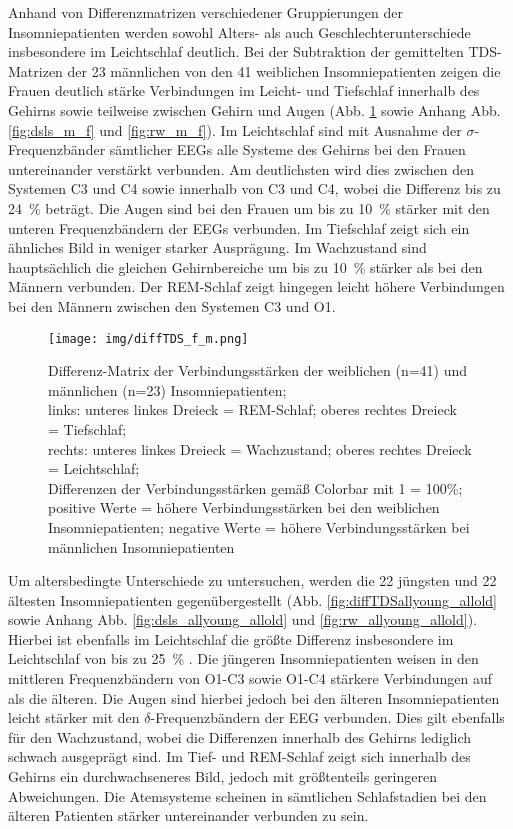 Anhand von Differenzmatrizen verschiedener Gruppierungen der Insomniepatienten werden sowohl Alters- als auch Geschlechterunterschiede insbesondere im Leichtschlaf deutlich. Bei der Subtraktion der gemittelten \acs{TDS}-Matrizen der 23 männlichen von den 41 weiblichen Insomniepatienten zeigen die Frauen deutlich stärke Verbindungen im Leicht- und Tiefschlaf innerhalb des Gehirns sowie teilweise zwischen Gehirn und Augen (Abb. \ref{fig:diffTDS_f_m} sowie Anhang Abb. \ref{fig:dsls_m_f} und \ref{fig:rw_m_f}). Im Leichtschlaf sind mit Ausnahme der $\sigma$-Frequenzbänder sämtlicher \acs{EEG}s alle Systeme des Gehirns bei den Frauen untereinander verstärkt verbunden. Am deutlichsten wird dies zwischen den Systemen C3 und C4 sowie innerhalb von C3 und C4, wobei die Differenz bis zu 24~\% beträgt. Die Augen sind bei den Frauen um bis zu 10~\% stärker mit den unteren Frequenzbändern der \acs{EEG}s verbunden. Im Tiefschlaf zeigt sich ein ähnliches Bild in weniger starker Ausprägung. Im Wachzustand sind hauptsächlich die gleichen Gehirnbereiche um bis zu 10~\% stärker als bei den Männern verbunden. Der \acs{REM}-Schlaf zeigt hingegen leicht höhere Verbindungen bei den Männern zwischen den Systemen C3 und O1.

\begin{figure}[H]
	\centering
	\texttt{[image: img/diffTDS\_f\_m.png]}
	\caption[Differenz-Matrix der Verbindungsstärken der weiblichen und männlichen Insomniepatienten]{Differenz-Matrix der Verbindungsstärken der weiblichen (n=41) und männlichen (n=23) Insomniepatienten;\\links: unteres linkes Dreieck = REM-Schlaf; oberes rechtes Dreieck = Tiefschlaf;\\rechts: unteres linkes Dreieck = Wachzustand; oberes rechtes Dreieck = Leichtschlaf;\\Differenzen der Verbindungsstärken gemäß Colorbar mit 1 = 100\%;\\positive Werte = höhere Verbindungsstärken bei den weiblichen Insomniepatienten; negative Werte = höhere Verbindungsstärken bei männlichen Insomniepatienten}
	\label{fig:diffTDS_f_m}
\end{figure}

Um altersbedingte Unterschiede zu untersuchen, werden die 22 jüngsten und 22 ältesten Insomniepatienten gegenübergestellt (Abb. \ref{fig:diffTDSallyoung_allold} sowie Anhang Abb. \ref{fig:dsls_allyoung_allold} und \ref{fig:rw_allyoung_allold}). Hierbei ist ebenfalls im Leichtschlaf die größte Differenz insbesondere im Leichtschlaf von bis zu 25~\% . Die jüngeren Insomniepatienten weisen in den mittleren Frequenzbändern von O1-C3 sowie O1-C4 stärkere Verbindungen auf als die älteren. Die Augen sind hierbei jedoch bei den älteren Insomniepatienten leicht stärker mit den $\delta$-Frequenzbändern der \acs{EEG} verbunden. Dies gilt ebenfalls für den Wachzustand, wobei die Differenzen innerhalb des Gehirns lediglich schwach ausgeprägt sind. Im Tief- und \acs{REM}-Schlaf zeigt sich innerhalb des Gehirns ein durchwachseneres Bild, jedoch mit größtenteils geringeren Abweichungen. Die Atemsysteme scheinen in sämtlichen Schlafstadien bei den älteren Patienten stärker untereinander verbunden zu sein. 

